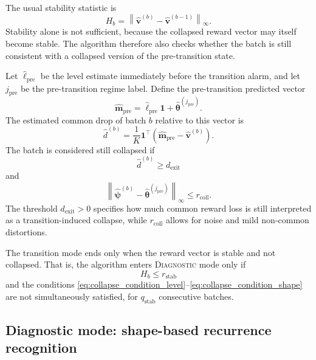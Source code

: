 \documentclass[11pt]{article}
\newcommand{\one}{\bm 1}
\newcommand{\norm}[1]{\left\lVert #1 \right\rVert}
\begin{document}
The usual stability statistic is
\begin{equation}
\label{eq:stability_statistic}
H_b
=
\norm{\widehat{\bm v}^{(b)}-\widehat{\bm v}^{(b-1)}}_{\infty}.
\end{equation}
Stability alone is not sufficient, because the collapsed reward vector may itself become stable. The algorithm therefore also checks whether the batch is still consistent with a collapsed version of the pre-transition state.

Let $\widehat\ell_{\mathrm{pre}}$ be the level estimate immediately before the transition alarm, and let $j_{\mathrm{pre}}$ be the pre-transition regime label. Define the pre-transition predicted vector
\begin{equation}
\label{eq:pre_transition_vector}
\widehat{\bm m}_{\mathrm{pre}}
=
\widehat\ell_{\mathrm{pre}}\one+\widehat{\bm\theta}^{(j_{\mathrm{pre}})}.
\end{equation}
The estimated common drop of batch $b$ relative to this vector is
\begin{equation}
\label{eq:estimated_common_drop}
\widehat d^{(b)}
=
\frac{1}{K}\one^\top
\left(
\widehat{\bm m}_{\mathrm{pre}}-\widehat{\bm v}^{(b)}
\right).
\end{equation}
The batch is considered still collapsed if
\begin{equation}
\label{eq:collapse_condition_level}
\widehat d^{(b)}\geq d_{\mathrm{exit}}
\end{equation}
and
\begin{equation}
\label{eq:collapse_condition_shape}
\norm{\widehat{\bm\psi}^{(b)}-
\widehat{\bm\theta}^{(j_{\mathrm{pre}})}}_{\infty}
\leq r_{\mathrm{coll}}.
\end{equation}
The threshold $d_{\mathrm{exit}}>0$ specifies how much common reward loss is still interpreted as a transition-induced collapse, while $r_{\mathrm{coll}}$ allows for noise and mild non-common distortions.

The transition mode ends only when the reward vector is stable and not collapsed. That is, the algorithm enters \textsc{Diagnostic} mode only if
\begin{equation}
\label{eq:transition_exit_condition}
H_b\leq r_{\mathrm{stab}}
\end{equation}
and the conditions \eqref{eq:collapse_condition_level}--\eqref{eq:collapse_condition_shape} are not simultaneously satisfied, for $q_{\mathrm{stab}}$ consecutive batches.

\subsection{Diagnostic mode: shape-based recurrence recognition}
\label{subsec:diagnostic_mode}
\end{document}
